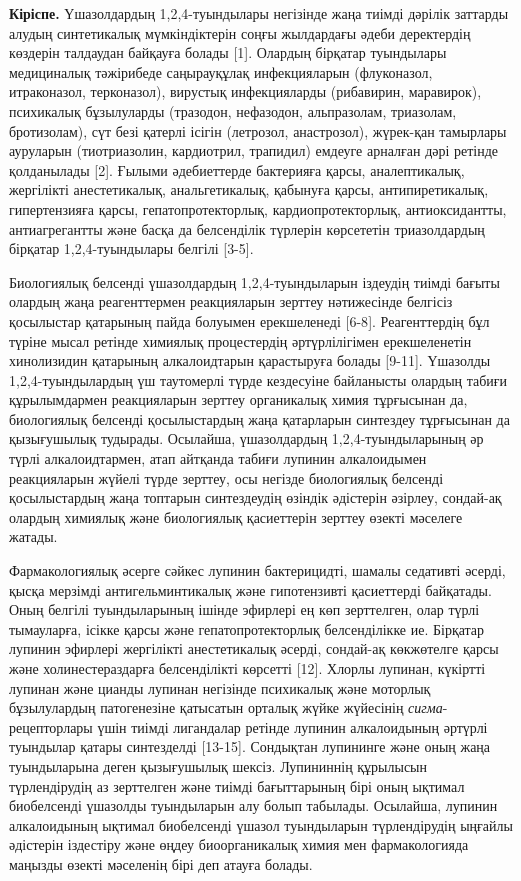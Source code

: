 \textbf{Кіріспе.} Үшазолдардың 1,2,4-туындылары негізінде жаңа тиімді
дәрілік заттарды алудың синтетикалық мүмкіндіктерін соңғы жылдардағы
әдеби деректердің көздерін талдаудан байқауға болады {[}1{]}. Олардың
бірқатар туындылары медициналық тәжірибеде саңырауқұлақ инфекцияларын
(флуконазол, итраконазол, терконазол), вирустық инфекцияларды
(рибавирин, маравирок), психикалық бұзылуларды (тразодон, нефазодон,
альпразолам, триазолам, бротизолам), сүт безі қатерлі ісігін (летрозол,
анастрозол), жүрек-қан тамырлары ауруларын (тиотриазолин, кардиотрил,
трапидил) емдеуге арналған дәрі ретінде қолданылады {[}2{]}. Ғылыми
әдебиеттерде бактерияға қарсы, аналептикалық, жергілікті анестетикалық,
анальгетикалық, қабынуға қарсы, антипиретикалық, гипертензияға қарсы,
гепатопротекторлық, кардиопротекторлық, антиоксидантты, антиагрегантты
және басқа да белсенділік түрлерін көрсететін триазолдардың бірқатар
1,2,4-туындылары белгілі {[}3-5{]}.

Биологиялық белсенді үшазолдардың 1,2,4-туындыларын іздеудің тиімді
бағыты олардың жаңа реагенттермен реакцияларын зерттеу нәтижесінде
белгісіз қосылыстар қатарының пайда болуымен ерекшеленеді {[}6-8{]}.
Реагенттердің бұл түріне мысал ретінде химиялық процестердің
әртүрлілігімен ерекшеленетін хинолизидин қатарының алкалоидтарын
қарастыруға болады {[}9-11{]}. Үшазолды 1,2,4-туындылардың үш таутомерлі
түрде кездесуіне байланысты олардың табиғи құрылымдармен реакцияларын
зерттеу органикалық химия тұрғысынан да, биологиялық белсенді
қосылыстардың жаңа қатарларын синтездеу тұрғысынан да қызығушылық
тудырады. Осылайша, үшазолдардың 1,2,4-туындыларының әр түрлі
алкалоидтармен, атап айтқанда табиғи лупинин алкалоидымен реакцияларын
жүйелі түрде зерттеу, осы негізде биологиялық белсенді қосылыстардың
жаңа топтарын синтездеудің өзіндік әдістерін әзірлеу, сондай-ақ олардың
химиялық және биологиялық қасиеттерін зерттеу өзекті мәселеге жатады.

Фармакологиялық әсерге сәйкес лупинин бактерицидті, шамалы седативті
әсерді, қысқа мерзімді антигельминтикалық және гипотензивті қасиеттерді
байқатады. Оның белгілі туындыларының ішінде эфирлері ең көп зерттелген,
олар түрлі тымауларға, ісікке қарсы және гепатопротекторлық
белсенділікке ие. Бірқатар лупинин эфирлері жергілікті анестетикалық
әсерді, сондай-ақ көкжөтелге қарсы және холинестераздарға белсенділікті
көрсетті {[}12{]}. Хлорлы лупинан, күкіртті лупинан және цианды лупинан
негізінде психикалық және моторлық бұзылулардың патогенезіне қатысатын
орталық жүйке жүйесінің \emph{сигма}-рецепторлары үшін тиімді лигандалар
ретінде лупинин алкалоидының әртүрлі туындылар қатары синтезделді
{[}13-15{]}. Сондықтан лупининге және оның жаңа туындыларына деген
қызығушылық шексіз. Лупининнің құрылысын түрлендірудің аз зерттелген
және тиімді бағыттарының бірі оның ықтимал биобелсенді үшазолды
туындыларын алу болып табылады. Осылайша, лупинин алкалоидының ықтимал
биобелсенді үшазол туындыларын түрлендірудің ыңғайлы әдістерін іздестіру
және өңдеу биоорганикалық химия мен фармакологияда маңызды өзекті
мәселенің бірі деп атауға болады.

